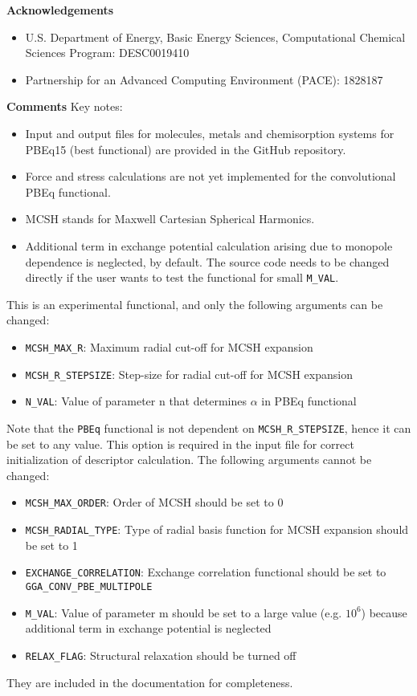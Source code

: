 \begin{frame}[allowframebreaks]{\textbf{Acknowledgements}} \label{Acknowledgements}
  \begin{itemize}
      \item U.S. Department of Energy, Basic Energy Sciences, Computational Chemical Sciences Program: DESC0019410
      \item Partnership for an Advanced Computing Environment (PACE): 1828187
  \end{itemize}
  \end{frame}

\begin{frame}[allowframebreaks]{\textbf{Comments}} \label{Introduction}
Key notes:
\begin{itemize}
    \item Input and output files for molecules, metals and chemisorption systems for PBEq15 (best functional) are provided in the GitHub repository.
    \item Force and stress calculations are not yet implemented for the convolutional PBEq functional. 
    \item MCSH stands for Maxwell Cartesian Spherical Harmonics.
    \item Additional term in exchange potential calculation arising due to monopole dependence is neglected, by default. The source code needs to be changed directly if the user wants to test the functional for small \texttt{M\_VAL}.
\end{itemize}
\newpage 
This is an experimental functional, and only the following arguments can be changed: 
\begin{itemize}
    \item \texttt{MCSH\_MAX\_R}: Maximum radial cut-off for MCSH expansion
    \item \texttt{MCSH\_R\_STEPSIZE}: Step-size for radial cut-off for MCSH expansion
    \item \texttt{N\_VAL}: Value of parameter n that determines $\alpha$ in PBEq functional
\end{itemize}
Note that the \texttt{PBEq} functional is not dependent on \texttt{MCSH\_R\_STEPSIZE}, hence it can be set to any value. This option is required in the input file for correct initialization of descriptor calculation.
\newpage
The following arguments cannot be changed:
\begin{itemize}
  \item \texttt{MCSH\_MAX\_ORDER}: Order of MCSH should be set to 0
  \item \texttt{MCSH\_RADIAL\_TYPE}: Type of radial basis function for MCSH expansion should be set to 1
  \item \texttt{EXCHANGE\_CORRELATION}: Exchange correlation functional should be set to \texttt{GGA\_CONV\_PBE\_MULTIPOLE} 
  \item \texttt{M\_VAL}: Value of parameter m should be set to a large value (e.g. $10^6$) because additional term in exchange potential is neglected
  \item \texttt{RELAX\_FLAG}: Structural relaxation should be turned off 
\end{itemize}
They are included in the documentation for completeness. 
\end{frame}

